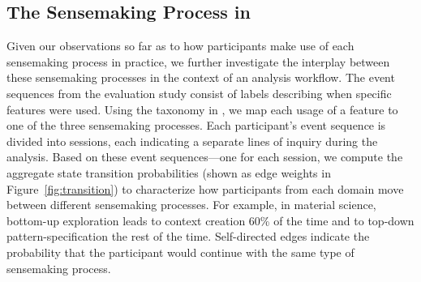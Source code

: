 \subsection{The Sensemaking Process in }
Given our observations so far as to
how participants
make use of each sensemaking process in practice,
we further investigate the interplay
between these sensemaking processes
in the context of an analysis workflow. %
The event sequences from the evaluation study
consist of labels describing when specific features were used.
Using the taxonomy in ,%
we map each usage of a feature
to one of the three sensemaking processes.
Each participant's event sequence
is divided into sessions,
each indicating a separate lines of inquiry
during the analysis.
Based on these event sequences---one for each session,
we compute the aggregate state transition probabilities
(shown as edge weights in Figure~\ref{fig:transition})
to characterize how participants from each domain
move between different sensemaking processes.
For example, in material science,
bottom-up exploration
leads to context creation 60\% of the time
and to top-down pattern-specification
the rest of the time.
Self-directed edges indicate the probability that the participant
would continue with the same type of sensemaking process.
